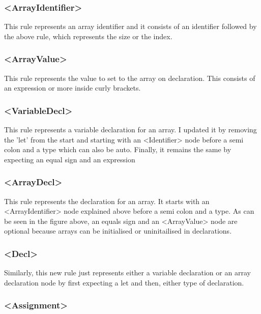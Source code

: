 \documentclass{article}
\begin{document}
				\subsubsection{\textless ArrayIdentifier\textgreater}
				
				This rule represents an array identifier and it consists of an identifier followed by the above rule, which represents the size or the index.
				
				\subsubsection{\textless ArrayValue\textgreater}
				
				This rule represents the value to set to the array on declaration. This consists of an expression or more inside curly brackets.
				
				\subsubsection{\textless VariableDecl\textgreater}
				
				This rule represents a variable declaration for an array. I updated it by removing the 'let' from the start and starting with an <Identifier> node before a semi colon and a type which can also be auto. Finally, it remains the same by expecting an equal sign and an expression
				
				\subsubsection{\textless ArrayDecl\textgreater}
				
				This rule represents the declaration for an array. It starts with an \textless ArrayIdentifier\textgreater{} node explained above before a semi colon and a type. As can be seen in the figure above, an equals sign and an \textless ArrayValue\textgreater{} node are optional because arrays can be initialised or uninitailised in declarations.
				
				
				\subsubsection{\textless Decl\textgreater}
				
				Similarly, this new rule just represents either a variable declaration or an array declaration node by first expecting a let and then, either type of declaration.
				
								\subsubsection{\textless Assignment\textgreater}
				
\end{document}
